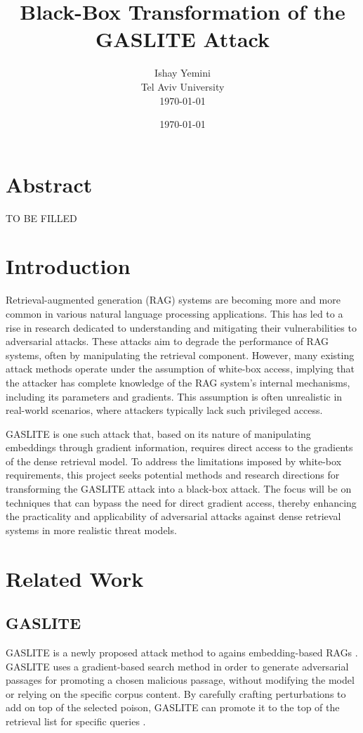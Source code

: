 \documentclass[a4paper, sigconf]{acmart}
\title{Black-Box Transformation of the GASLITE Attack}
\author{Ishay Yemini\\Tel Aviv University\\ \today}
\date{\today}
\begin{document}
\maketitle

\section{Abstract}

TO BE FILLED

\section{Introduction}

Retrieval-augmented generation (RAG) systems are becoming more and more common in various natural language processing applications. This has led to a rise in research dedicated to understanding and mitigating their vulnerabilities to adversarial attacks. These attacks aim to degrade the performance of RAG systems, often by manipulating the retrieval component. However, many existing attack methods operate under the assumption of white-box access, implying that the attacker has complete knowledge of the RAG system's internal mechanisms, including its parameters and gradients. This assumption is often unrealistic in real-world scenarios, where attackers typically lack such privileged access. 

GASLITE is one such attack that, based on its nature of manipulating embeddings through gradient information, requires direct access to the gradients of the dense retrieval model. To address the limitations imposed by white-box requirements, this project seeks potential methods and research directions for transforming the GASLITE attack into a black-box attack. The focus will be on techniques that can bypass the need for direct gradient access, thereby enhancing the practicality and applicability of adversarial attacks against dense retrieval systems in more realistic threat models.


\section{Related Work}

\subsection{GASLITE}

GASLITE is a newly proposed attack method to agains embedding-based RAGs \cite{bentov2024}. 
GASLITE uses a gradient-based search method in order to generate adversarial passages for promoting a chosen malicious passage, without modifying the model or relying on the specific corpus content. 
By carefully crafting perturbations to add on top of the selected poison, GASLITE can promote it to the top of the retrieval list for specific queries \cite{bentov2024}.
\end{document}

